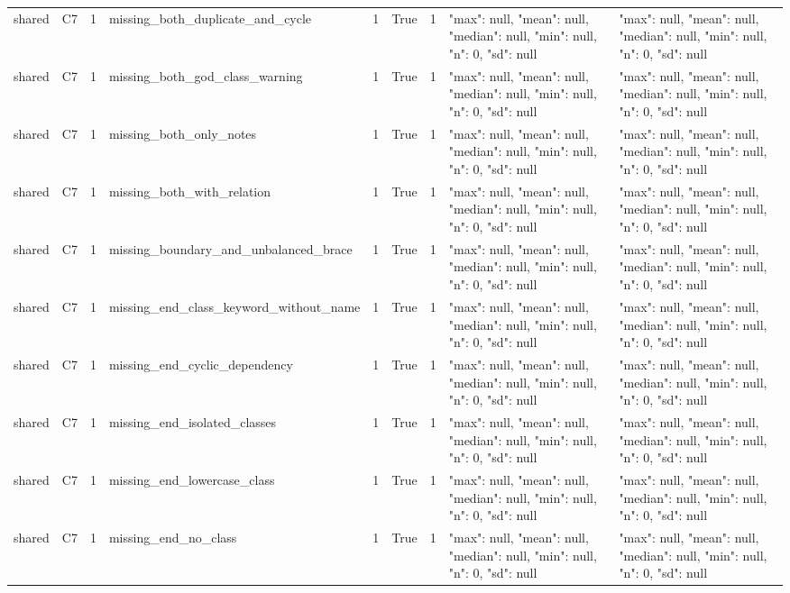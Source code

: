 \begin{tabular}{lllllllll}
shared & C7 & 1 & missing\_both\_duplicate\_and\_cycle & 1 & True & 1 & {"max": null, "mean": null, "median": null, "min": null, "n": 0, "sd": null} & {"max": null, "mean": null, "median": null, "min": null, "n": 0, "sd": null} \\
shared & C7 & 1 & missing\_both\_god\_class\_warning & 1 & True & 1 & {"max": null, "mean": null, "median": null, "min": null, "n": 0, "sd": null} & {"max": null, "mean": null, "median": null, "min": null, "n": 0, "sd": null} \\
shared & C7 & 1 & missing\_both\_only\_notes & 1 & True & 1 & {"max": null, "mean": null, "median": null, "min": null, "n": 0, "sd": null} & {"max": null, "mean": null, "median": null, "min": null, "n": 0, "sd": null} \\
shared & C7 & 1 & missing\_both\_with\_relation & 1 & True & 1 & {"max": null, "mean": null, "median": null, "min": null, "n": 0, "sd": null} & {"max": null, "mean": null, "median": null, "min": null, "n": 0, "sd": null} \\
shared & C7 & 1 & missing\_boundary\_and\_unbalanced\_brace & 1 & True & 1 & {"max": null, "mean": null, "median": null, "min": null, "n": 0, "sd": null} & {"max": null, "mean": null, "median": null, "min": null, "n": 0, "sd": null} \\
shared & C7 & 1 & missing\_end\_class\_keyword\_without\_name & 1 & True & 1 & {"max": null, "mean": null, "median": null, "min": null, "n": 0, "sd": null} & {"max": null, "mean": null, "median": null, "min": null, "n": 0, "sd": null} \\
shared & C7 & 1 & missing\_end\_cyclic\_dependency & 1 & True & 1 & {"max": null, "mean": null, "median": null, "min": null, "n": 0, "sd": null} & {"max": null, "mean": null, "median": null, "min": null, "n": 0, "sd": null} \\
shared & C7 & 1 & missing\_end\_isolated\_classes & 1 & True & 1 & {"max": null, "mean": null, "median": null, "min": null, "n": 0, "sd": null} & {"max": null, "mean": null, "median": null, "min": null, "n": 0, "sd": null} \\
shared & C7 & 1 & missing\_end\_lowercase\_class & 1 & True & 1 & {"max": null, "mean": null, "median": null, "min": null, "n": 0, "sd": null} & {"max": null, "mean": null, "median": null, "min": null, "n": 0, "sd": null} \\
shared & C7 & 1 & missing\_end\_no\_class & 1 & True & 1 & {"max": null, "mean": null, "median": null, "min": null, "n": 0, "sd": null} & {"max": null, "mean": null, "median": null, "min": null, "n": 0, "sd": null} \\

\end{tabular}
